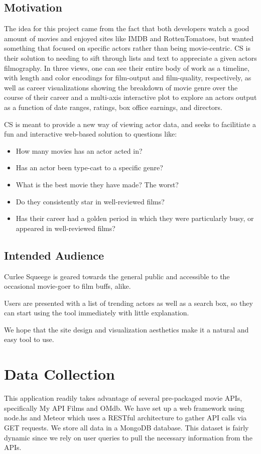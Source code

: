 \documentclass[12pt]{article}
\begin{document}
\subsection{Motivation}
	The idea for this project came from the fact that both developers watch a good amount of movies and enjoyed sites like IMDB and RottenTomatoes, but wanted something that focused on specific actors rather than being movie-centric. CS is their solution to needing to sift through lists and text to appreciate a given actors filmography. In three views, one can see their entire body of work as a timeline, with length and color encodings for film-output and film-quality, respectively, as well as career visualizations showing the breakdown of movie genre over the course of their career and a multi-axis interactive plot to explore an actors output as a function of date ranges, ratings, box office earnings, and directors.
	
	CS is meant to provide a new way of viewing actor data, and seeks to facilitiate a fun and interactive web-based solution to questions like:


	\begin{itemize}
		\item How many movies has an actor acted in?
		\item Has an actor been type-cast to a specific genre?
		\item What is the best movie they have made? The worst?
		\item Do they consistently star in well-reviewed films?
		\item Has their career had a golden period in which they were particularly busy, or appeared in well-reviewed films?
	\end{itemize}
	
\subsection{Intended Audience}
Curlee Squeege is geared towards the general public and accessible to the occasional movie-goer to film buffs, alike.  

Users are presented with a list of trending actors as well as a search box, so they can start using the tool immediately with little explanation.

We hope that the site design and visualization aesthetics make it a natural and easy tool to use.
\newpage 

\section{Data Collection}
	This application readily takes advantage of several pre-packaged movie APIs, specifically My API Films and OMdb. We have set up a web framework using node.hs and Meteor which uses a RESTful architecture to gather API calls via GET requests. We store all data in a MongoDB database. This dataset is fairly dynamic since we rely on user queries to pull the necessary information from the APIs.
	
\end{document}
